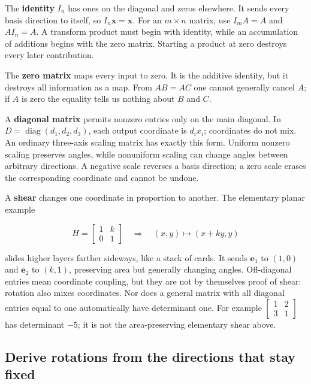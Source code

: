 The \textbf{identity} \(I_n\) has ones on the diagonal and zeros elsewhere. It sends every basis direction to itself, so \(I_n\mathbf x=\mathbf x\). For an \(m\times n\) matrix, use \(I_mA=A\) and \(AI_n=A\). A transform product must begin with identity, while an accumulation of additions begins with the zero matrix. Starting a product at zero destroys every later contribution.

The \textbf{zero matrix} maps every input to zero. It is the additive identity, but it destroys all information as a map. From \(AB=AC\) one cannot generally cancel \(A\); if \(A\) is zero the equality tells us nothing about \(B\) and \(C\).

A \textbf{diagonal matrix} permits nonzero entries only on the main diagonal. In \(D=\operatorname{diag}(d_1,d_2,d_3)\), each output coordinate is \(d_ix_i\); coordinates do not mix. An ordinary three-axis scaling matrix has exactly this form. Uniform nonzero scaling preserves angles, while nonuniform scaling can change angles between arbitrary directions. A negative scale reverses a basis direction; a zero scale erases the corresponding coordinate and cannot be undone.

A \textbf{shear} changes one coordinate in proportion to another. The elementary planar example

\[
H=\begin{bmatrix}1&k\\0&1\end{bmatrix}
\quad\Longrightarrow\quad(x,y)\mapsto(x+ky,y)
\]

slides higher layers farther sideways, like a stack of cards. It sends \(\mathbf e_1\) to \((1,0)\) and \(\mathbf e_2\) to \((k,1)\), preserving area but generally changing angles. Off-diagonal entries mean coordinate coupling, but they are not by themselves proof of shear: rotation also mixes coordinates. Nor does a general matrix with all diagonal entries equal to one automatically have determinant one. For example \(\begin{bmatrix}1&2\\3&1\end{bmatrix}\) has determinant \(-5\); it is not the area-preserving elementary shear above.

\subsection{Derive rotations from the directions that stay fixed}\label{01-foundations-i-ch018-derive-rotations-from-the-directions-that-stay-fixed}

